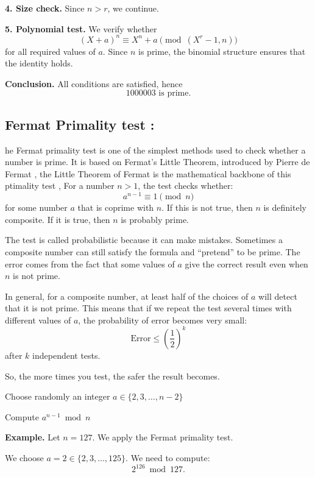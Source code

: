 \textbf{4. Size check.} Since $n > r$, we continue.

\textbf{5. Polynomial test.} We verify whether
\[
(X + a)^n \equiv X^n + a \pmod{(X^r - 1, n)}
\]
for all required values of $a$.  
Since $n$ is prime, the binomial structure ensures that the identity holds.

\textbf{Conclusion.} All conditions are satisfied, hence
\[
1000003 \text{ is prime.}
\]
\subsection{Fermat Primality test :}
he Fermat primality test is one of the simplest methods used to check whether a number is prime. It is based on Fermat’s Little Theorem, introduced by Pierre de Fermat , the Little Theorem of Fermat is the mathematical backbone of this ptimality test , For a number $n > 1$, the test checks whether:
\[
a^{n-1} \equiv 1 \pmod{n}
\]
for some number $a$ that is coprime with $n$. If this is not true, then $n$ is definitely composite. If it is true, then $n$ is probably prime.

The test is called probabilistic because it can make mistakes. Sometimes a composite number can still satisfy the formula and ``pretend'' to be prime. The error comes from the fact that some values of $a$ give the correct result even when $n$ is not prime.

In general, for a composite number, at least half of the choices of $a$ will detect that it is not prime. This means that if we repeat the test several times with different values of $a$, the probability of error becomes very small:
\[
\text{Error} \le \left(\frac{1}{2}\right)^k
\]
after $k$ independent tests.

So, the more times you test, the safer the result becomes.
\begin{algorithm}[H]
\caption{Fermat Primality Test}

Choose randomly an integer $a \in \{2, 3, \dots, n-2\}$\;

Compute $a^{n-1} \bmod n$\;



\end{algorithm}
\textbf{Example.} Let $n = 127$. We apply the Fermat primality test.

We choose $a = 2 \in \{2,3,\dots,125\}$. We need to compute:
\[
2^{126} \bmod 127.
\]


